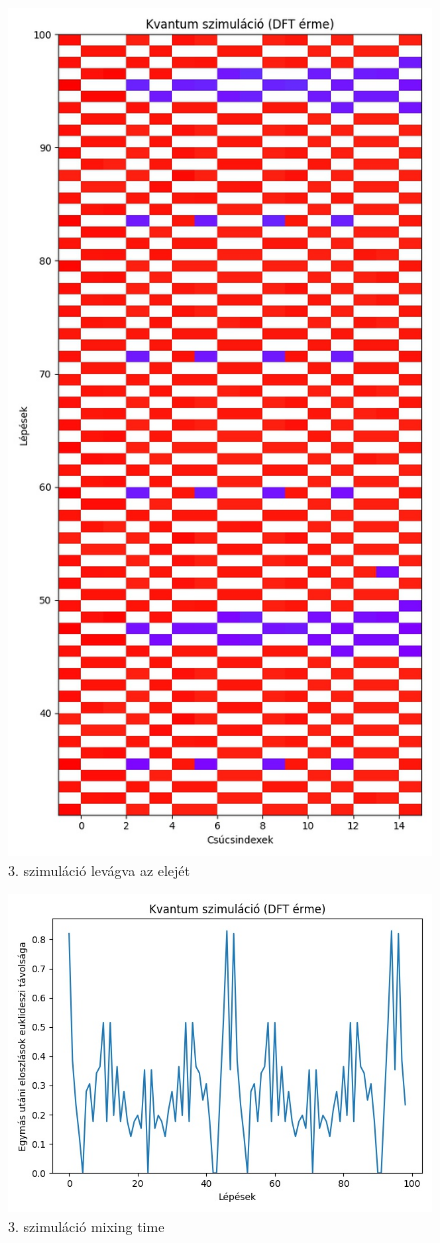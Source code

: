 \documentclass[14pt,a4paper]{article}
\begin{document}
\begin{figure}[H]
\centering
\includegraphics[width = 0.7\columnwidth]{sim_03/counts_short.jpg}
\caption{3. szimuláció levágva az elejét}
\end{figure}
\begin{figure}[H]
\centering
\includegraphics[width = 0.7\columnwidth]{sim_03/mixing_time.jpg}
\caption{3. szimuláció mixing time}
\end{figure}
\end{document}
